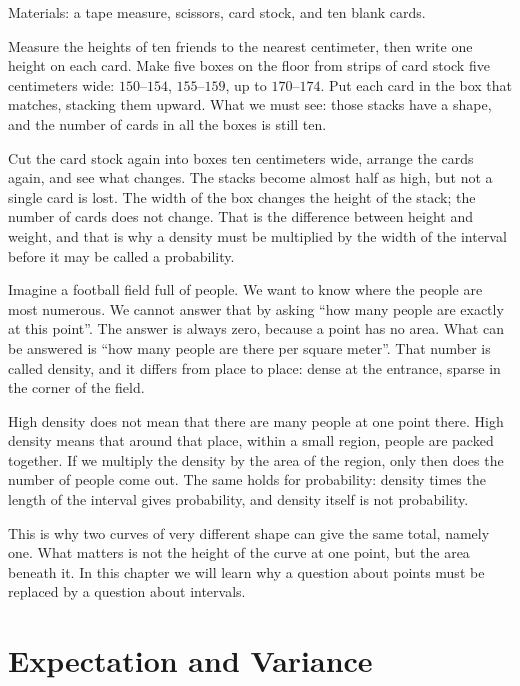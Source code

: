 \begin{tangan}
Materials: a tape measure, scissors, card stock, and ten blank cards.

Measure the heights of ten friends to the nearest centimeter, then write one height on each
card. Make five boxes on the floor from strips of card stock five centimeters wide:
$150$--$154$, $155$--$159$, up to $170$--$174$. Put each card in the box that
matches, stacking them upward. What we must see: those stacks have a shape, and the number of
cards in all the boxes is still ten.

Cut the card stock again into boxes ten centimeters wide, arrange the cards again,
and see what changes. The stacks become almost half as high, but not a single card
is lost. The width of the box changes the height of the stack; the number of cards does not
change. That is the difference between height and weight, and that is why a density must be multiplied
by the width of the interval before it may be called a probability.
\end{tangan}

\begin{untukanak}
Imagine a football field full of people. We want to know where the people are
most numerous. We cannot answer that by asking ``how many people are exactly at
this point''. The answer is always zero, because a point has no area. What can
be answered is ``how many people are there per square meter''. That number is called density,
and it differs from place to place: dense at the entrance, sparse in the corner of the field.

High density does not mean that there are many people at one point there. High
density means that around that place, within a small region, people are packed together. If we
multiply the density by the area of the region, only then does the number of people come out. The same
holds for probability: density times the length of the interval gives probability, and density
itself is not probability.

This is why two curves of very different shape can give the same total,
namely one. What matters is not the height of the curve at one point, but the area beneath it.
In this chapter we will learn why a question about points must be replaced by a question
about intervals.
\end{untukanak}

\section{Expectation and Variance}

